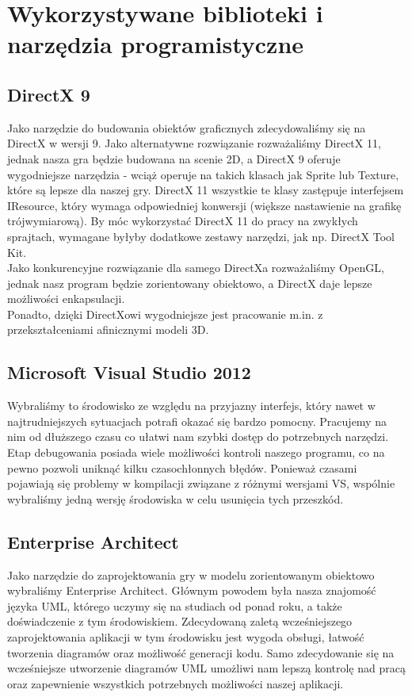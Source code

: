 \documentclass[a4paper,twoside]{article}
\begin{document}
	
	\newpage
	
	\section{Wykorzystywane biblioteki i narzędzia programistyczne}
		\subsection{DirectX 9}
			Jako narzędzie do budowania obiektów graficznych zdecydowaliśmy się na DirectX w wersji 9. Jako alternatywne rozwiązanie rozważaliśmy DirectX 11, jednak nasza gra będzie budowana na scenie 2D, a DirectX 9 oferuje wygodniejsze narzędzia - wciąż operuje na takich klasach jak Sprite lub Texture, które są lepsze dla naszej gry. DirectX 11 wszystkie te klasy zastępuje interfejsem IResource, który wymaga odpowiedniej konwersji (większe nastawienie na grafikę trójwymiarową). By móc wykorzystać DirectX 11 do pracy na zwykłych sprajtach, wymagane byłyby dodatkowe zestawy narzędzi, jak np. DirectX Tool Kit.\\
			Jako konkurencyjne rozwiązanie dla samego DirectXa rozważaliśmy OpenGL, jednak nasz program będzie zorientowany obiektowo, a DirectX daje lepsze możliwości enkapsulacji.\\
			Ponadto, dzięki DirectXowi wygodniejsze jest pracowanie m.in. z przekształceniami afinicznymi modeli 3D.
			
		\subsection{Microsoft Visual Studio 2012}
			Wybraliśmy to środowisko ze względu na przyjazny interfejs, który nawet w najtrudniejszych sytuacjach potrafi okazać się bardzo pomocny. Pracujemy na nim od dłuższego czasu co ułatwi nam szybki dostęp do potrzebnych narzędzi. Etap debugowania posiada wiele możliwości kontroli naszego programu, co na pewno pozwoli uniknąć kilku czasochłonnych błędów. Ponieważ czasami pojawiają się problemy w kompilacji związane z różnymi wersjami VS, wspólnie wybraliśmy jedną wersję środowiska w celu usunięcia tych przeszkód.
			
		\subsection{Enterprise Architect}
			Jako narzędzie do zaprojektowania gry w modelu zorientowanym obiektowo wybraliśmy Enterprise Architect. Głównym powodem była nasza znajomość języka UML, którego uczymy się na studiach od ponad roku, a także doświadczenie z tym środowiskiem. Zdecydowaną zaletą wcześniejszego zaprojektowania aplikacji w tym środowisku jest wygoda obsługi, łatwość tworzenia diagramów oraz możliwość generacji kodu. Samo zdecydowanie się na wcześniejsze utworzenie diagramów UML umożliwi nam lepszą kontrolę nad pracą oraz zapewnienie wszystkich potrzebnych możliwości naszej aplikacji.
		
\end{document}
